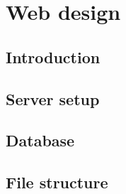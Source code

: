 \chapter{Web design}
\section{Introduction}
%

\section{Server setup}
%

\section{Database}
%

\section{File structure}
%
